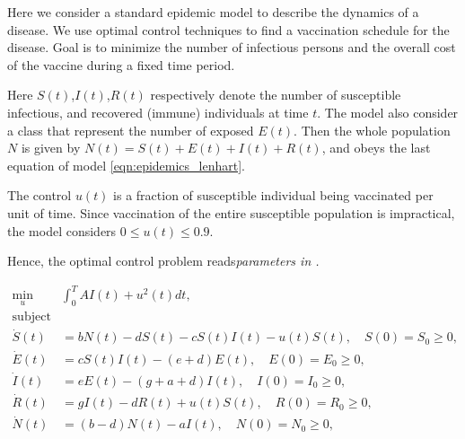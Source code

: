   Here we consider a standard epidemic model to describe the dynamics of a 
disease. We use optimal control techniques to find a vaccination
schedule for the disease. Goal is to minimize the number of infectious 
persons and the overall cost of the vaccine during a fixed time period. 

  Here $S(t)$,$I(t)$,$R(t)$ respectively denote the number of susceptible 
infectious, and recovered (immune) individuals at time $t$. The model also 
consider a class that represent the number of exposed $E(t)$. 
Then the whole population $N$ is given by $N(t) = S(t) + E(t) + I(t) + R (t)$,
and obeys the last equation of model \eqref{eqn:epidemics_lenhart}.

The control $u(t)$ is a fraction of susceptible individual being 
vaccinated per unit of time. Since vaccination of the entire susceptible 
population is impractical, the model considers $0 \leq u(t) \leq 0.9$. 

Hence, the optimal control problem reads\em parameters in 
.


\begin{equation} \label{eqn:epidemics_lenhart}
  \begin{aligned}
    \min_{u} & \int_{0}^{T} AI(t) + u^{2}(t) dt,
    \\
    \text{subject to}
    \\
      \dot{S}(t) &=
          bN(t) - dS(t) - cS(t)I(t) - u(t)S(t), \quad S(0) = S_0 \geq 0,   \\
      \dot{E}(t) &=
          cS(t)I(t) - (e + d)E(t), \quad E(0) = E_0 \geq 0,    \\
      \dot{I}(t) &=
          eE(t) - (g + a +d)I(t), \quad I(0) = I_0 \geq 0,     \\
      \dot{R}(t) &=
          gI(t) -dR(t) + u(t)S(t), \quad R(0) = R_0 \geq 0,    \\
      \dot{N}(t) &=
          (b - d)N(t) - aI(t), \quad N(0) = N_0 \geq 0,        \\
  \end{aligned}
\end{equation}

